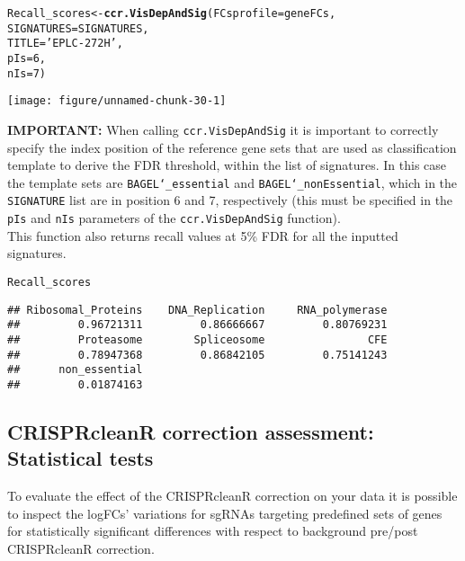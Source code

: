 \documentclass{article}\usepackage[]{graphicx}\usepackage[]{color}
\makeatletter
\def\maxwidth{ %
  \ifdim\Gin@nat@width>\linewidth
    \linewidth
  \else
    \Gin@nat@width
  \fi
}
\newcommand{\hlnum}[1]{\textcolor[rgb]{0.686,0.059,0.569}{#1}}%
\newcommand{\hlstr}[1]{\textcolor[rgb]{0.192,0.494,0.8}{#1}}%
\newcommand{\hlstd}[1]{\textcolor[rgb]{0.345,0.345,0.345}{#1}}%
\newcommand{\hlkwb}[1]{\textcolor[rgb]{0.69,0.353,0.396}{#1}}%
\newcommand{\hlkwc}[1]{\textcolor[rgb]{0.333,0.667,0.333}{#1}}%
\newcommand{\hlkwd}[1]{\textcolor[rgb]{0.737,0.353,0.396}{\textbf{#1}}}%
\newenvironment{kframe}{%
 \def\at@end@of@kframe{}%
 \ifinner\ifhmode%
  \def\at@end@of@kframe{\end{minipage}}%
  \begin{minipage}{\columnwidth}%
 \fi\fi%
 \def\FrameCommand##1{\hskip\@totalleftmargin \hskip-\fboxsep
 \colorbox{shadecolor}{##1}\hskip-\fboxsep
     \hskip-\linewidth \hskip-\@totalleftmargin \hskip\columnwidth}%
 \MakeFramed {\advance\hsize-\width
   \@totalleftmargin\z@ \linewidth\hsize
   \@setminipage}}%
 {\par\unskip\endMakeFramed%
 \at@end@of@kframe}
\newenvironment{knitrout}{}{} %
\makeatother
\begin{document}
\begin{knitrout}
\color{fgcolor}\begin{kframe}
\begin{alltt}
\hlstd{Recall_scores}\hlkwb{<-}\hlkwd{ccr.VisDepAndSig}\hlstd{(}\hlkwc{FCsprofile} \hlstd{= geneFCs,}
                             \hlkwc{SIGNATURES} \hlstd{= SIGNATURES,}
                             \hlkwc{TITLE} \hlstd{=} \hlstr{'EPLC-272H'}\hlstd{,}
                             \hlkwc{pIs} \hlstd{=} \hlnum{6}\hlstd{,}
                             \hlkwc{nIs} \hlstd{=} \hlnum{7}\hlstd{)}
\end{alltt}
\end{kframe}

{\centering \texttt{[image: figure/unnamed-chunk-30-1]} 

}



\end{knitrout}
%
\textbf{IMPORTANT:} When calling \texttt{ccr.VisDepAndSig} it is important to correctly specify the index position of the reference gene sets that are used as classification template to derive the FDR threshold, within the list of signatures. In this case the template sets are \texttt{BAGEL\char`_essential} and \texttt{BAGEL\char`_nonEssential}, which in the \texttt{SIGNATURE} list are in position 6 and 7, respectively (this must be specified in the \texttt{pIs} and \texttt{nIs} parameters of the \texttt{ccr.VisDepAndSig} function).\\
%
This function also returns recall values at 5\% FDR for all the inputted signatures.

\begin{knitrout}
\color{fgcolor}\begin{kframe}
\begin{alltt}
\hlstd{Recall_scores}
\end{alltt}
\begin{verbatim}
## Ribosomal_Proteins    DNA_Replication     RNA_polymerase 
##         0.96721311         0.86666667         0.80769231 
##         Proteasome        Spliceosome                CFE 
##         0.78947368         0.86842105         0.75141243 
##      non_essential 
##         0.01874163
\end{verbatim}
\end{kframe}
\end{knitrout}

\subsection{CRISPRcleanR correction assessment: Statistical tests}
To evaluate the effect of the CRISPRcleanR correction on your data it is possible to inspect the logFCs' variations for sgRNAs targeting predefined sets of genes for statistically significant differences with respect to background pre/post CRISPRcleanR correction.\\
\end{document}
